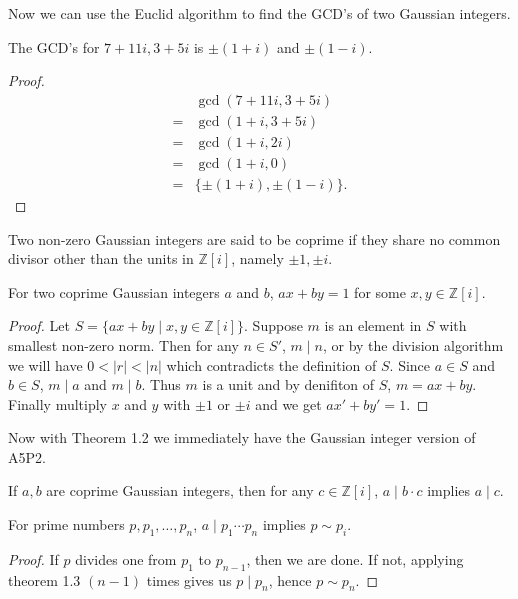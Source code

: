 \documentclass{article}
\begin{document}
Now we can use the Euclid algorithm to find the GCD's of two Gaussian integers.

\begin{example}
The GCD's for $7+11i, 3+5i$ is $\pm (1+i)$ and $\pm (1-i)$. 
\end{example}

\begin{proof}
$$
\begin{aligned} & \gcd (7+11 i, 3+5 i) \\=& \operatorname{gcd}(1+i, 3+5 i) \\=& \operatorname{gcd}(1+i, 2 i)  \\ =&\operatorname{gcd}(1+i, 0) \\ =&\{\pm(1+i),\pm (1-i)\}. \end{aligned}$$
\end{proof}

\begin{definition}
Two non-zero Gaussian integers are said to be coprime if they share no common divisor other than the units in $\mathbb{Z}[i]$, namely $\pm 1, \pm i$.
\end{definition}

\begin{theorem}
For two coprime Gaussian integers $a$ and $b$, $ax+by = 1$ for some $x,y\in \mathbb{Z}[i].$
\end{theorem}

\begin{proof}
Let $S=\{ax+by\mid x,y\in \mathbb{Z}[i]\}$. Suppose $m$ is an element in $S$ with smallest non-zero norm. Then for any $n \in S'$, $m \mid n$, or by the division algorithm we will have $0<|r|<|n|$ which contradicts the definition of $S$. Since $a \in S$ and $b \in S$, $m\mid a$ and $m\mid b$. Thus $m$ is a unit and by denifiton of $S$, $m = ax+by$. Finally multiply $x$ and $y$ with $\pm 1$ or $\pm i$ and we get $ax'+by' = 1$.
\end{proof}

Now with Theorem 1.2 we immediately have the Gaussian integer version of A5P2.
\begin{theorem}
If $a, b$ are coprime Gaussian integers, then for any $c \in \mathbb{Z}[i]$, $a\mid b\cdot c$ implies $a\mid c$.
\end{theorem}

\begin{corollary}
For prime numbers $p,p_1, \ldots, p_n$, $a\mid p_1 \cdots p_n$ implies $p \sim p_i$.
\end{corollary}
\begin{proof}
If $p$ divides one from $p_1$ to $p_{n-1}$, then we are done. If not, applying theorem 1.3 $(n-1)$ times gives us $p \mid p_n$, hence $p \sim p_n$.
\end{proof}
\end{document}
